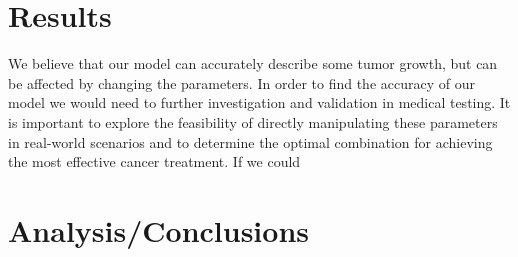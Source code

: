 \documentclass[11pt]{amsart}
\begin{document}
\section{Results}
 We believe that our model can accurately describe some tumor growth, but can be affected by changing the parameters. In order to find the accuracy of our model we would need to further investigation and validation in medical testing. It is important to explore the feasibility of directly manipulating these parameters in real-world scenarios and to determine the optimal combination for achieving the most effective cancer treatment. If we could 

\section{Analysis/Conclusions}







\FloatBarrier %
\newpage

{} %

\end{document}
